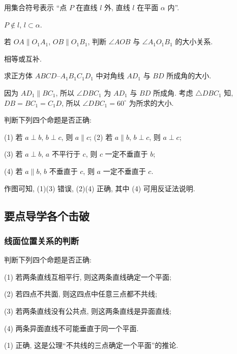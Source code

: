 \lianxi
\begin{exercise}
    用集合符号表示 ``点 $P$ 在直线 $l$ 外, 直线 $l$ 在平面 $\alpha$ 内''.
\end{exercise}
\beginsolution
    $P\notin l$, $l\subset \alpha$.
\endsolution

\begin{exercise}
    若 $OA\parallel O_1 A_1$, $OB\parallel O_1 B_1$, 判断 $\angle AOB$ 与 $\angle A_1 O_1 B_1$ 的大小关系.
\end{exercise}
\beginsolution
    相等或互补.
\endsolution

\begin{exercise}
    求正方体 $ABCD\text{--}A_1 B_1 C_1 D_1$ 中对角线 $AD_1$ 与 $BD$ 所成角的大小.
\end{exercise}
\beginsolution
    因为 $AD_1\parallel BC_1$, 
    所以 $\angle DBC_1$ 为 $AD_1$ 与 $BD$ 所成角. 考虑 $\triangle DBC_1$ 知, $DB=BC_1=C_1D$, 所以 $\angle  DBC_1= 60^\circ$ 为所求的大小.
\endsolution

\begin{exercise}
    判断下列四个命题是否正确:
    
    (1) 若 $a\perp b$, $b\perp c$, 则 $a\parallel c$;\qquad
    (2) 若 $a\parallel b$, $b\perp c$, 则 $a\perp c$;
    
    (3) 若 $a\perp b$, $a$ 不平行于 $c$, 则 $c$ 一定不垂直于 $b$;
    
    (4) 若 $a\parallel b$, $b$ 不垂直于 $c$, 则 $a$ 一定不垂直于 $c$.    
\end{exercise}
\beginsolution
    作图可知, (1)(3) 错误, (2)(4) 正确, 其中 (4) 可用反证法说明.
\endsolution

\subsection{要点导学\quad 各个击破}

\subsubsection{线面位置关系的判断}
\begin{example}
    判断下列四个命题是否正确:
    
    (1) 若两条直线互相平行, 则这两条直线确定一个平面;
    
    (2) 若四点不共面, 则这四点中任意三点都不共线;
    
    (3) 若两条直线没有公共点, 则这两条直线是异面直线;
    
    (4) 两条异面直线不可能垂直于同一个平面.
\end{example}
\beginsolution
    (1) 正确, 这是公理“不共线的三点确定一个平面”的推论.

